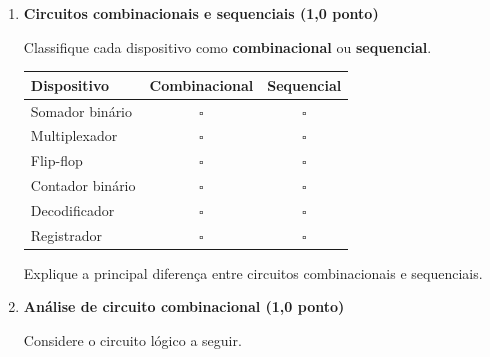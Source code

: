 \documentclass[a4paper,12pt]{article}
\begin{document}
\begin{enumerate}[
    leftmargin=0.8cm,
    label=\textbf{\arabic*.},
    itemsep=0.7cm
]


\item \textbf{Circuitos combinacionais e sequenciais \hfill (1,0 ponto)}

Classifique cada dispositivo como \textbf{combinacional} ou
\textbf{sequencial}.

\vspace{0.2cm}

\begin{center}
\renewcommand{\arraystretch}{1.5}

\begin{tabular}{|l|c|c|}
\hline
\textbf{Dispositivo}
&
\textbf{Combinacional}
&
\textbf{Sequencial}
\\
\hline

Somador binário & $\square$ & $\square$ \\
\hline

Multiplexador & $\square$ & $\square$ \\
\hline

Flip-flop & $\square$ & $\square$ \\
\hline

Contador binário & $\square$ & $\square$ \\
\hline

Decodificador & $\square$ & $\square$ \\
\hline

Registrador & $\square$ & $\square$ \\
\hline

\end{tabular}
\end{center}

Explique a principal diferença entre circuitos combinacionais e sequenciais.

\vspace{1.5cm}


\item \textbf{Análise de circuito combinacional \hfill (1,0 ponto)}

Considere o circuito lógico a seguir.


\end{enumerate}
\end{document}
